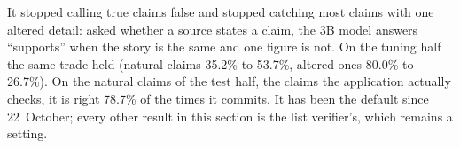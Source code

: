 It stopped calling true claims false and stopped catching most claims
with one altered detail: asked whether a source states a claim, the 3B
model answers ``supports'' when the story is the same and one figure is
not. On the tuning half the same trade held (natural claims 35.2\% to
53.7\%, altered ones 80.0\% to 26.7\%). On the natural claims of the
test half, the claims the application actually checks, it is right
78.7\% of the times it commits. It has been the default since
22~October; every other result in this section is the list verifier's,
which remains a setting.
